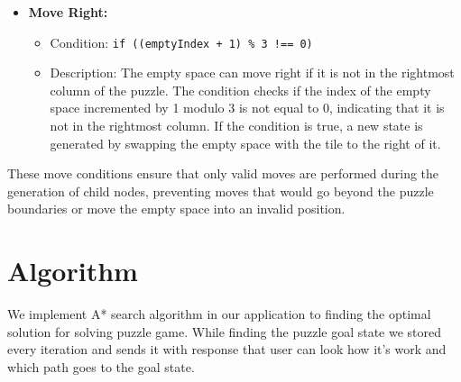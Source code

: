 \documentclass[12pt]{report}
\begin{document}
\begin{itemize}
        \item \textbf{Move Right:}
        \begin{itemize}
            \item Condition: \texttt{if ((emptyIndex + 1) \% 3 !== 0)}
            \item Description: The empty space can move right if it is not in the rightmost column of the puzzle. The condition checks if the index of the empty space incremented by 1 modulo 3 is not equal to 0, indicating that it is not in the rightmost column. If the condition is true, a new state is generated by swapping the empty space with the tile to the right of it.
        \end{itemize}
    \end{itemize}\newline \newline
    These move conditions ensure that only valid moves are performed during the generation of child nodes, preventing moves that would go beyond the puzzle boundaries or move the empty space into an invalid position.


\section{Algorithm}
We implement A* search algorithm in our application to finding the optimal solution for solving puzzle game. While finding the puzzle goal state we stored every iteration and sends it with response that user can look how it's work and which path goes to the goal state.
\end{document}
